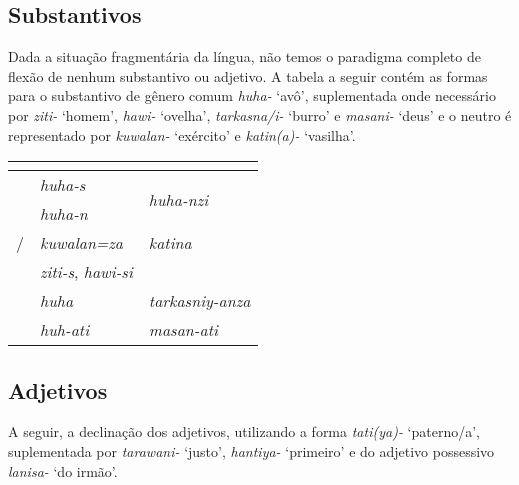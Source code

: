 \subsection{Substantivos}

Dada a situação fragmentária da língua, não temos o paradigma
completo de flexão de nenhum substantivo ou adjetivo. A tabela a seguir contém
as formas para o substantivo de gênero comum \emph{huha-} `avô', suplementada
onde necessário por \emph{ziti-} `homem', \emph{hawi-} `ovelha', \emph{tarkasna\slash{}i-}
`burro' e \emph{masani-} `deus' e o neutro é representado por \emph{kuwalan-}
`exército' e \emph{katin{(a)}-} `vasilha'.


\begin{center}
	\begin{tabular}[c]{lll}
		\toprule
		                      & \Sg{}\emph{}                  & \Pl{}\emph{}                       \\
		\midrule
		\Nom{} \Com{}         & \emph{huha-s}                 & \multirow{2}{4em}{\emph{huha-nzi}} \\
		\Acu{} \Com{}         & \emph{huha-n}                 &                                    \\
		\Nom{}/\Acu{} \Neut{} & \emph{kuwalan=za}             & \emph{katina}                      \\
		\Gen{}                & \emph{ziti-s}, \emph{hawi-si} &                                    \\
		\Dat{}                & \emph{huha}                   & \emph{tarkasniy-anza}              \\
		\Abl{}                & \emph{huh-ati}                & \emph{masan-ati}                   \\
		\bottomrule
	\end{tabular}
\end{center}


\subsection{Adjetivos}
A seguir, a declinação dos adjetivos, utilizando a forma \emph{tati{(ya)}-}
`paterno\slash{}a', suplementada por \emph{tarawani-} `justo',
\emph{hanti{ya}-} `primeiro' e do adjetivo possessivo \emph{lanisa-} `do irmão'.

